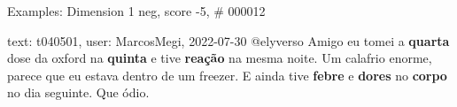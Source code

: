 \begin{frame}{Examples: Dimension 1 neg, score -5, \# 000012}
\footnotesize
\begin{alertblock}{text: t040501, user: MarcosMegi, 2022-07-30}
@elyverso Amigo eu tomei a \textbf{quarta} dose da oxford na \textbf{quinta} e 
tive \textbf{reação} na mesma noite. Um calafrio enorme, parece que eu estava 
dentro de um freezer. E ainda tive \textbf{febre} e \textbf{dores} no 
\textbf{corpo} no dia seguinte. Que ódio. 
\end{alertblock}
\end{frame}
